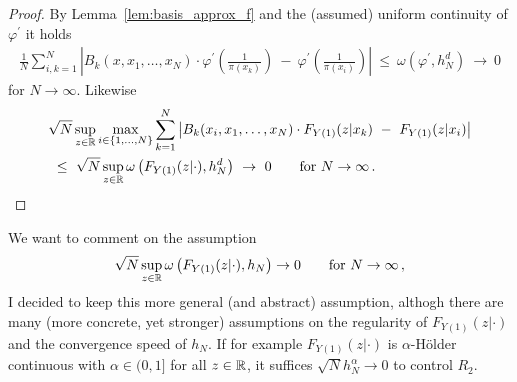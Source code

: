 \begin{proof}
  By Lemma~\ref{lem:basis_approx_f} 
  and the (assumed) uniform continuity of $\varphi^{'}$
  it holds
      \begin{align*}
        \frac
        {1}
        {N}
        \sum_{i,k=1}^{N}
            \left|
        B_k(x,x_1,\ldots,x_N)
        \cdot
            \varphi^{'}
            \left(
              \frac
              {1}
              {\pi(x_k)}
            \right)
            \ 
            -
            \ 
            \varphi^{'}
            \left(
              \frac
              {1}
              {\pi(x_i)}
            \right)
            \right|
            \ 
            \le
            \ 
   \omega
   \left(
     \varphi^{'},h_N^d
   \right)
            \ 
            \to
            \ 
            0
          \end{align*}
          for $N\to\infty$.
          Likewise
\begin{align*}
  &
        \sqrt{N}
        \sup_{z\in\R}
        \max_{i\in \left\{ 1,\ldots,N \right\}}
        \sum_{k=1}^{N}
            \left|
        B_k(x_i,x_1,\ldots,x_N)
        \cdot
        F_{Y(1)}(z|x_k)
            \ 
            -
            \ 
        F_{Y(1)}(z|x_i)
          \right|
             \\
            &
            \ 
            \le
            \ 
            \sqrt{N}
            \sup_{z\in\R}
            \omega
            \left(
        F_{Y(1)}(z|\cdot)
        ,
        h_N^d
            \right)
            \ 
            \to
            \ 
            0
            \qquad
            \text{for}
            \ 
            N\to\infty
            \,.
\end{align*}
        \end{proof}
        \begin{remark}
We want to comment on the assumption
\begin{gather*}
  \sqrt{N}
  \sup_{z\in\R}
  \omega
  \left( 
    F_{Y(1)}(z|\cdot)
    ,h_N
  \right)
  \to
  0
  \qquad
  \text{for}\ 
  N\to \infty
  \,,
\end{gather*}
I decided to keep this more general (and abstract) assumption, althogh
there are many (more concrete, yet stronger) assumptions on the regularity of
$
    F_{Y(1)}(z|\cdot)
$
and the convergence speed of $h_N$.
If for example 
$
    F_{Y(1)}(z|\cdot)
$
is $\alpha$-Hölder continuous with $\alpha\in(0,1]$ for all $z\in\mathbb{R}$, it suffices $\sqrt{N}h_N^\alpha\to0$ to control $R_2$.

        \end{remark}
